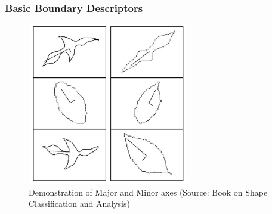 \documentclass[english,11pt,table,handout]{beamer}
\begin{document}
\frame
{
	\frametitle{Basic Boundary Descriptors}
	\large
	\begin{figure}[!h]
		\includegraphics[width=7cm]{major_minor_axes.png}
		\caption{Demonstration of Major and Minor axes (Source: Book on Shape Classification and Analysis)}
	\end{figure}
}
\end{document}
